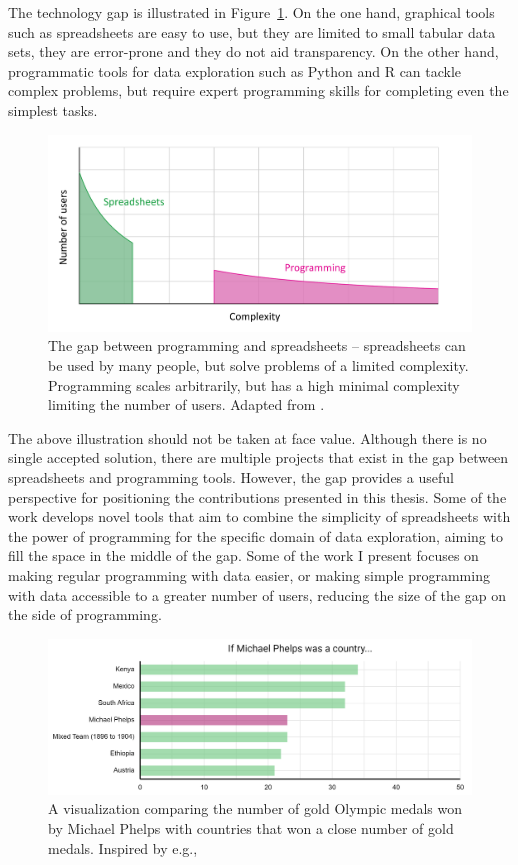 \documentclass[fleqn,11pt]{report}
\theoremstyle{definition}
\begin{document}
The technology gap is illustrated in Figure~\ref{fig:gap}. On the one hand, graphical tools such as
spreadsheets are easy to use, but they are limited to small tabular data sets, they are error-prone
\citep{panko-2015-errors} and they do not aid transparency. On the other hand, programmatic tools for
data exploration such as Python and R can tackle complex problems, but require expert programming
skills for completing even the simplest tasks.

\begin{figure}[h!]
\centering
\includegraphics[scale=0.25]{img/gap.png}
\vspace{-0.5em}
\caption{The gap between programming and spreadsheets -- spreadsheets can be used by many people,
but solve problems of a limited complexity. Programming scales arbitrarily, but has a high minimal
complexity limiting the number of users. Adapted from \citet{edwards-2015-transcript}.}
\label{fig:gap}
\end{figure}

The above illustration should not be taken at face value. Although there is no single accepted
solution, there are multiple projects that exist in the gap between spreadsheets and programming
tools. However, the gap provides a useful perspective for positioning the contributions presented
in this thesis. Some of the work develops novel tools that aim to combine the simplicity of
spreadsheets with the power of programming for the specific domain of data exploration, aiming to
fill the space in the middle of the gap. Some of the work I present focuses on making regular
programming with data easier, or making simple programming with data accessible to a greater
number of users, reducing the size of the gap on the side of programming.

\begin{figure}[t]
\includegraphics[scale=0.345]{img/phelps.png}
\caption{A visualization comparing the number of gold Olympic medals won by Michael Phelps
 with countries that won a close number of gold medals. Inspired by e.g., \cite{npr-2016-phelps}}
\label{fig:phelps}
\end{figure}
\end{document}
